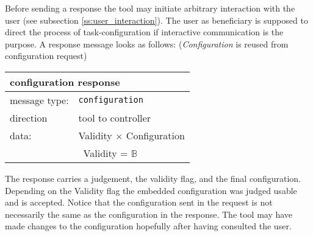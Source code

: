 \documentclass{article}
\newcommand{\msg}[1]{\texttt{#1}}
\begin{document}
   Before sending a response the tool may initiate arbitrary interaction with
   the user (see subsection \ref{ss:user_interaction}). The user as beneficiary
   is supposed to direct the process of task-configuration if interactive
   communication is the purpose. A response message looks as follows:
   (\textit{Configuration} is reused from configuration request)

   \begin{table}[H]
    \begin{center}
     \begin{tabular}{|ll|}
      \hline
       \multicolumn{2}{|l|}{\textbf{configuration response}} \\
      \hline
       message type:   & \msg{configuration} \\
      \hline
       direction       & tool to controller \\
       data:           & Validity $\times$ Configuration \\
                       & \ Validity = $\mathbb{B}$ \\
      \hline
     \end{tabular}
    \end{center}
    \vspace{-0.4cm}
   \end{table}

   \noindent The response carries a judgement, the validity flag, and the final
   configuration.  Depending on the Validity flag the embedded configuration
   was judged usable and is accepted. Notice that the configuration sent in the
   request is not necessarily the same as the configuration in the response.
   The tool may have made changes to the configuration hopefully after having
   consulted the user.


\end{document}
